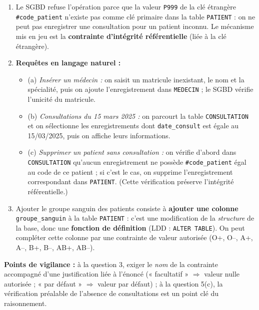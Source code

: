 \documentclass[11pt]{article}
\begin{document}
\begin{corrige}
\begin{enumerate}
\begin{itemize}
\item (d) \texttt{code\_patient} : contrainte de \textbf{clé primaire} (unicité et non-nullité), car il identifie chaque patient de manière unique ;
\item (e) \texttt{date\_consult} : \textbf{format de valeur} de type date (jour/mois/année valide), éventuellement complétée par « valeur nulle interdite ».
\end{itemize}
\item Le SGBD refuse l'opération parce que la valeur \texttt{P999} de la clé étrangère \texttt{\#code\_patient} n'existe pas comme clé primaire dans la table \texttt{PATIENT} : on ne peut pas enregistrer une consultation pour un patient inconnu. Le mécanisme mis en jeu est la \textbf{contrainte d'intégrité référentielle} (liée à la clé étrangère).
\item \textbf{Requêtes en langage naturel :}
\begin{itemize}
\item (a) \emph{Insérer un médecin :} on saisit un matricule inexistant, le nom et la spécialité, puis on ajoute l'enregistrement dans \texttt{MEDECIN} ; le SGBD vérifie l'unicité du matricule.
\item (b) \emph{Consultations du 15 mars 2025 :} on parcourt la table \texttt{CONSULTATION} et on sélectionne les enregistrements dont \texttt{date\_consult} est égale au 15/03/2025, puis on affiche leurs informations.
\item (c) \emph{Supprimer un patient sans consultation :} on vérifie d'abord dans \texttt{CONSULTATION} qu'aucun enregistrement ne possède \texttt{\#code\_patient} égal au code de ce patient ; si c'est le cas, on supprime l'enregistrement correspondant dans \texttt{PATIENT}. (Cette vérification préserve l'intégrité référentielle.)
\end{itemize}
\item Ajouter le groupe sanguin des patients consiste à \textbf{ajouter une colonne} \texttt{groupe\_sanguin} à la table \texttt{PATIENT} : c'est une modification de la \emph{structure} de la base, donc une \textbf{fonction de définition} (LDD : \texttt{ALTER TABLE}). On peut compléter cette colonne par une contrainte de valeur autorisée (O+, O--, A+, A--, B+, B--, AB+, AB--).
\end{enumerate}

\textbf{Points de vigilance :} à la question 3, exiger le \emph{nom} de la contrainte accompagné d'une justification liée à l'énoncé (« facultatif » $\Rightarrow$ valeur nulle autorisée ; « par défaut » $\Rightarrow$ valeur par défaut) ; à la question 5(c), la vérification préalable de l'absence de consultations est un point clé du raisonnement.
\end{corrige}
\end{document}

